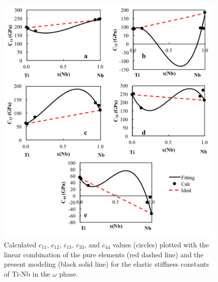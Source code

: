 \pagebreak
\begin{figure}[H]
	\centering
	\includegraphics[width=\textwidth]{Chapter-7/Figures/omegae1.png}
	\caption{Calculated $c_{11}$, $c_{12}$, $c_{13}$, $c_{33}$, and $c_{44}$ values (circles) plotted with the linear combination of the pure elements (red dashed line) and the present modeling (black solid line) for the elastic stiffness constants of Ti-Nb in the $\omega$ phase.}
	\label{Ch7-figure:omegae1}
\end{figure}

